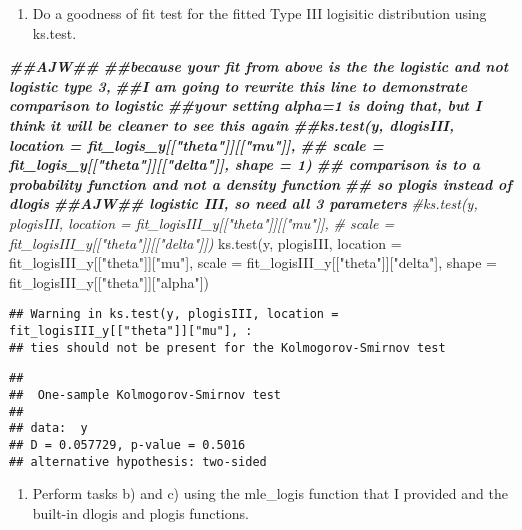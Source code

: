 \documentclass[
]{article}
\newenvironment{Shaded}{\begin{snugshade}}{\end{snugshade}}
\newcommand{\AttributeTok}[1]{\textcolor[rgb]{0.77,0.63,0.00}{#1}}
\newcommand{\CommentTok}[1]{\textcolor[rgb]{0.56,0.35,0.01}{\textit{#1}}}
\newcommand{\DocumentationTok}[1]{\textcolor[rgb]{0.56,0.35,0.01}{\textbf{\textit{#1}}}}
\newcommand{\FunctionTok}[1]{\textcolor[rgb]{0.00,0.00,0.00}{#1}}
\newcommand{\NormalTok}[1]{#1}
\newcommand{\StringTok}[1]{\textcolor[rgb]{0.31,0.60,0.02}{#1}}
\providecommand{\tightlist}{%
  \setlength{\itemsep}{0pt}\setlength{\parskip}{0pt}}
\begin{document}
\begin{enumerate}
\def\labelenumi{\alph{enumi})}
\setcounter{enumi}{2}
\tightlist
\item
  Do a goodness of fit test for the fitted Type III logisitic
  distribution using ks.test.
\end{enumerate}

\begin{Shaded}
\begin{Highlighting}[]
\DocumentationTok{\#\#AJW\#\#}
\DocumentationTok{\#\#because your fit from above is the the logistic and not logistic type 3, }
\DocumentationTok{\#\#I am going to rewrite this line to demonstrate comparison to logistic}
\DocumentationTok{\#\#your setting alpha=1 is doing that, but I think it will be cleaner to see this again}
\DocumentationTok{\#\#ks.test(y, dlogisIII, location = fit\_logis\_y[["theta"]][["mu"]], }
\DocumentationTok{\#\#        scale = fit\_logis\_y[["theta"]][["delta"]], shape = 1)}
\DocumentationTok{\#\# comparison is to a probability function and not a density function}
\DocumentationTok{\#\# so plogis instead of dlogis}
\DocumentationTok{\#\#AJW\#\# logistic III, so need all 3 parameters}
\CommentTok{\#ks.test(y, plogisIII, location = fit\_logisIII\_y[["theta"]][["mu"]], }
\CommentTok{\#        scale = fit\_logisIII\_y[["theta"]][["delta"]])}
\FunctionTok{ks.test}\NormalTok{(y, plogisIII, }\AttributeTok{location =}\NormalTok{ fit\_logisIII\_y[[}\StringTok{"theta"}\NormalTok{]][}\StringTok{"mu"}\NormalTok{], }
        \AttributeTok{scale =}\NormalTok{ fit\_logisIII\_y[[}\StringTok{"theta"}\NormalTok{]][}\StringTok{"delta"}\NormalTok{],}
        \AttributeTok{shape =}\NormalTok{ fit\_logisIII\_y[[}\StringTok{"theta"}\NormalTok{]][}\StringTok{"alpha"}\NormalTok{])}
\end{Highlighting}
\end{Shaded}

\begin{verbatim}
## Warning in ks.test(y, plogisIII, location = fit_logisIII_y[["theta"]]["mu"], :
## ties should not be present for the Kolmogorov-Smirnov test
\end{verbatim}

\begin{verbatim}
## 
##  One-sample Kolmogorov-Smirnov test
## 
## data:  y
## D = 0.057729, p-value = 0.5016
## alternative hypothesis: two-sided
\end{verbatim}

\begin{enumerate}
\def\labelenumi{\alph{enumi})}
\setcounter{enumi}{3}
\tightlist
\item
  Perform tasks b) and c) using the mle\_logis function that I provided
  and the built-in dlogis and plogis functions.
\end{enumerate}
\end{document}
